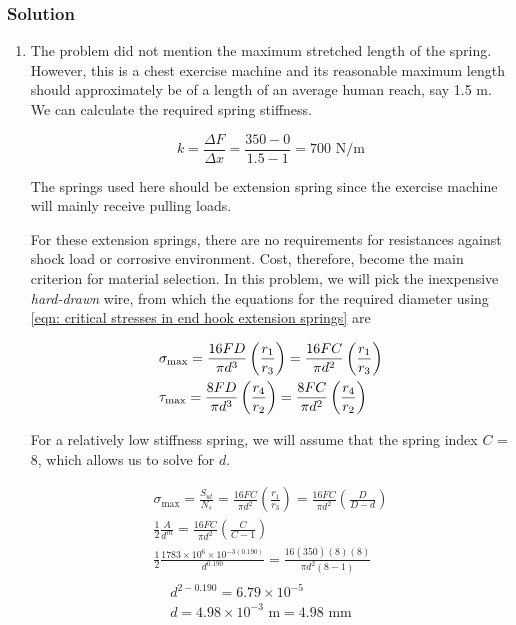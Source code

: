 \documentclass[
10pt,
a4paper,
openany,
svgnames,
]{book}
\begin{document}
\subsubsection{Solution}

\begin{enumerate}

\item  The problem did not mention the maximum stretched length of the spring. However, this is a chest exercise machine and its reasonable maximum length should approximately be of a length of an average human reach, say 1.5 m. We can calculate the required spring stiffness.
  
  \[k = \frac{\Delta F}{\Delta x} = \frac{350 - 0}{1.5 - 1} = 700\text{ N/m}\]

  The springs used here should be extension spring since the exercise machine will mainly receive pulling loads.

  For these extension springs, there are no requirements for resistances against shock load or corrosive environment. Cost, therefore, become the main criterion for material selection. In this problem, we will pick the inexpensive \emph{hard-drawn} wire, from which the equations for the required diameter using \cref{eqn: critical stresses in end hook extension springs} are

  \[\begin{gathered}
      \sigma_{\max} = \frac{16FD}{\pi d^3}\left( \frac{r_1}{r_3} \right) = \frac{16FC}{\pi d^2}\left( \frac{r_1}{r_3} \right) \hfill \\
      \tau_{\max} = \frac{8FD}{\pi d^3}\left( \frac{r_4}{r_2} \right) = \frac{8FC}{\pi d^2}\left( \frac{r_4}{r_2} \right) \hfill \\ 
    \end{gathered} \]

  For a relatively low stiffness spring, we will assume that the spring index $C$ = 8, which allows us to solve for $d$.

  \begin{gather*}
    \sigma_{\max} = \frac{S_{ut}}{N_s} = \frac{16FC}{\pi d^2}\left( \frac{r_1}{r_3} \right) = \frac{16FC}{\pi d^2}\left( \frac{D}{D - d} \right) \\
    \frac{1}{2}\frac{A}{d^m} = \frac{16FC}{\pi d^2}\left( \frac{C}{C - 1} \right) \\ 
    \frac{1}{2}\frac{1783 \times 10^6 \times 10^{-3(0.190)}}{d^{0.190}} = \frac{16(350)(8)(8)}{\pi d^2(8 - 1)} \\
    \begin{aligned}
      &d^{2-0.190} = 6.79 \times 10^{-5} \\ 
      &d = 4.98 \times 10^{-3} \text{ m} = 4.98\text{ mm}
    \end{aligned}
  \end{gather*}


\end{enumerate}
\end{document}
